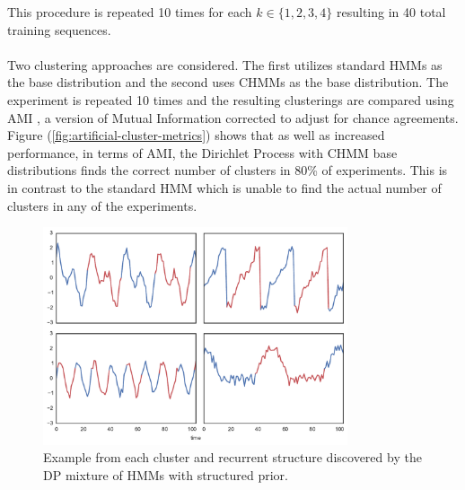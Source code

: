 \documentclass[12pt]{report}
\newcommand{\1}[0]{\mathbbm{1}}
\begin{document}
This procedure is repeated 10 times for each $k \in \{1,2,3,4\}$ resulting in 40
total training sequences.
\\\\
Two clustering approaches are considered. The first utilizes standard \acp{HMM}
as the base distribution and the second uses \acp{CHMM} as the base distribution.
The experiment is repeated 10 times and the resulting clusterings are compared using 
\ac{AMI} \cite{ami}, a version of Mutual Information corrected to adjust for chance agreements. 
Figure (\ref{fig:artificial-cluster-metrics}) shows that as well as increased performance,
in terms of \ac{AMI}, the Dirichlet Process with \ac{CHMM} base distributions finds
the correct number of clusters in 80\% of experiments. This is in contrast to the standard
\ac{HMM} which is unable to find the actual number of clusters in any of the experiments.

\begin{figure}[H]
    \centering
    \includegraphics[width=0.8\textwidth]{./img/artificial-clusters.pdf}
    \caption{Example from each cluster and recurrent structure
    discovered by the DP mixture of HMMs with structured prior.}
    \label{fig:artificial-clusters}
\end{figure}
\end{document}
